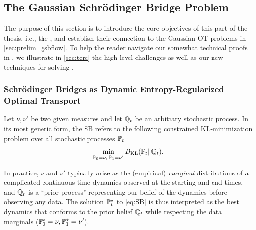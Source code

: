\subsection{The Gaussian Schr\"odinger Bridge Problem}
\label{sec:overview_gsbflow}


The purpose of this section is to introduce the core objectives of this part of the thesis, i.e., the , and establish their connection to the Gaussian \acrshort{OT} problems in \cref{sec:prelim_gsbflow}. To help the reader navigate our somewhat technical proofs in ,  we illustrate in \cref{sec:tere} the high-level challenges as well as our new techniques for solving .

\subsubsection{Schr\"odinger Bridges as Dynamic Entropy-Regularized Optimal Transport}


Let $\nu, \nu'$ be two given measures and let $\refpro$ be an arbitrary stochastic process. In its most generic form, the \acrlong{SB} refers to the following constrained KL-minimization problem over all stochastic processes $\Pmargin$ \citep{leonard2013survey, chen2021stochastic}: 
\begin{equation}
\label{eq:SB}
\min_{ \substack{ \Pinit = \nu, \; \Pend = \nu'} } \KL(\Pmargin \|\refpro).%
\end{equation}


In practice, $\nu$ and $\nu'$ typically arise as the (empirical) \emph{marginal} distributions of a complicated continuous-time dynamics observed at the starting and end times, and $\refpro$ is a ``prior process'' representing our belief of the dynamics before observing any data. The solution $\Pstar$ to \eqref{eq:SB} is thus interpreted as the best dynamics that conforms to the prior belief $\refpro$ while respecting the data marginals ($\Pstar[0] = \nu, \Pstar[\horizon] = \nu'$). 

